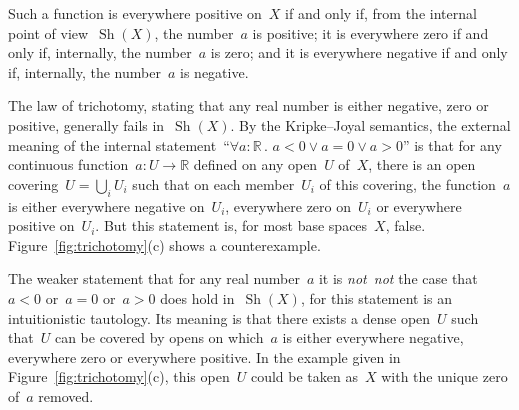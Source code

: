 \documentclass[oneside,reqno]{amsart}
\theoremstyle{definition}
\theoremstyle{plain}
\theoremstyle{remark}
\newcommand{\RR}{\mathbb{R}}
\DeclareMathOperator{\Sh}{Sh}
\renewcommand{\_}{\mathpunct{.}\,}
\newcommand{\?}{\,{:}\,}
\newcommand{\notnot}{\emph{not~not}\xspace}
\begin{document}
Such a function is everywhere positive on~$X$ if and only if, from the internal point of
view~$\Sh(X)$, the number~$a$ is positive; it is everywhere zero if and only
if, internally, the number~$a$ is zero; and it is everywhere negative if and
only if, internally, the number~$a$ is negative.

The law of trichotomy, stating that any real number is either negative, zero or
positive, generally fails in~$\Sh(X)$. By the Kripke--Joyal semantics, the external
meaning of the internal statement~``$\forall a:\RR\_ a<0 \vee a=0 \vee a>0$'' is that for any continuous function~$a : U
\to \RR$ defined on any open~$U$ of~$X$, there is an open covering~$U =
\bigcup_i U_i$ such that on each member~$U_i$ of this covering, the function~$a$ is
either everywhere negative on~$U_i$, everywhere zero on~$U_i$ or everywhere
positive on~$U_i$. But this statement is, for most base spaces~$X$, false.
Figure~\ref{fig:trichotomy}(c) shows a counterexample.

The weaker statement that for any real number~$a$ it is \notnot the case that~$a < 0$
or~$a = 0$ or~$a > 0$ does hold in~$\Sh(X)$, for this statement is an
intuitionistic tautology. Its meaning is that there exists a
dense open~$U$ such that~$U$ can be covered by opens on which~$a$ is either
everywhere negative, everywhere zero or everywhere positive. In the example
given in Figure~\ref{fig:trichotomy}(c), this open~$U$ could be taken as~$X$
with the unique zero of~$a$ removed.
\end{document}
